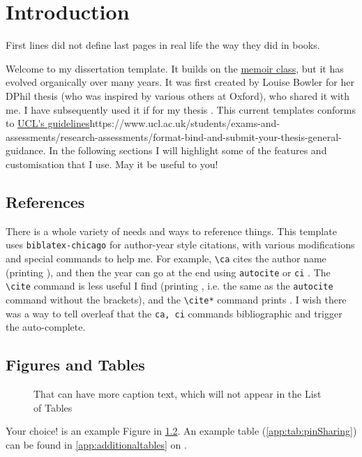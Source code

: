 \chapter{Introduction}
\label{ch:introduction}

\begin{displayquote}
First lines did not define last pages in real life the way they did in books.
\end{displayquote}

Welcome to my dissertation template.
It builds on the \href{http://tug.ctan.org/tex-archive/macros/latex/contrib/memoir/memman.pdf}{memoir class}, but it has evolved organically over many years.
It was first created by Louise Bowler for her DPhil thesis  (who was inspired by various others at Oxford), who shared it with me.
I have subsequently used it if for my thesis .
This current templates conforms to \url{UCL's guidelines}{https://www.ucl.ac.uk/students/exams-and-assessments/research-assessments/format-bind-and-submit-your-thesis-general-guidance}.
In the following sections I will highlight some of the features and customisation that I use.
May it be useful to you!

\section{References}
\label{int:references}

There is a whole variety of needs and ways to reference things.
This template uses \texttt{biblatex-chicago} for author-year style citations, with various modifications and special commands to help me.
For example, \texttt{\textbackslash ca} cites the author name (printing ), and then the year can go at the end using \texttt{autocite} or \texttt{ci} .
The \texttt{\textbackslash cite} command is less useful I find (printing \cite{becker_measuring_2019}, i.e. the same as the \texttt{autocite} command without the brackets), and the \texttt{\textbackslash cite*} command prints \cite*{becker_measuring_2019}.
I wish there was a way to tell overleaf that the \texttt{ca, ci} commands bibliographic and trigger the auto-complete. 

\section{Figures and Tables}
\label{int:figures}

\begin{figure}[!htb]
    \centering
    \caption[A placeholder caption]{That can have more caption text, which will not appear in the List of Tables}
    \label{int:fig:exampleCaption}
\end{figure}

Your choice!
 is an example Figure in \cref{int:figures}.
An example table (\cref{app:tab:pinSharing}) can be found in \cref{app:additionaltables} on .


